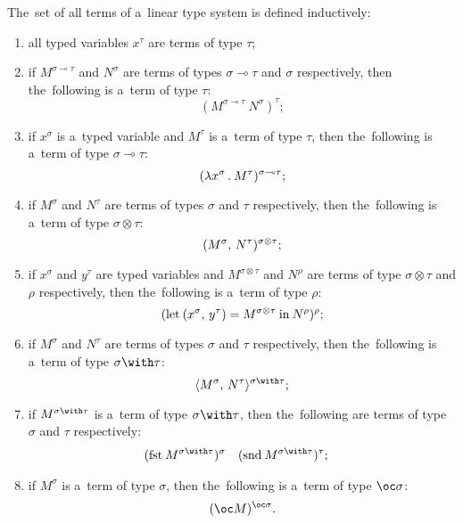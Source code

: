 \begin{definition}
  The~set of all terms of a~linear type system is defined inductively:
  \begin{enumerate}
    \item all typed variables $x^\tau$ are terms of type $\tau$;
    \item if $M^{\sigma \multimap \tau}$ and $N^\sigma$ are terms of types
      $\sigma \multimap \tau$ and $\sigma$ respectively, then the~following is
      a~term of type $\tau$:
      \[
        (M^{\sigma \multimap \tau} \: N^\sigma)^\tau;
      \]
    \item if $x^\sigma$ is a~typed variable and $M^\tau$ is a~term of type
      $\tau$, then the~following is a~term of type $\sigma \multimap \tau$:
      \[
        (\lambda x^\sigma \, . \: M^\tau)^{\sigma \multimap \tau};
      \]
    \item if $M^\sigma$ and $N^\tau$ are terms of types $\sigma$ and $\tau$
      respectively, then the~following is a~term of type $\sigma \otimes
      \tau$:
      \[
        (M^\sigma, \, N^\tau) ^{\sigma \otimes \tau};
      \]
    \item if $x^\sigma$ and $y^\tau$ are typed variables and $M^{\sigma \otimes
      \tau}$ and $N^\rho$ are terms of type $\sigma \otimes \tau$ and $\rho$
      respectively, then the~following is a~term of type $\rho$:
      \[
        (\textrm{let} \: (x^\sigma, \, y^\tau) = M^{\sigma \otimes \tau} \:
        \textrm{in} \: N^{\rho})^\rho;
      \]
    \item if $M^\sigma$ and $N^\tau$ are terms of types $\sigma$ and $\tau$
      respectively, then the~following is a~term of type $\sigma \with
      \tau$:
      \[
        \apair {M^\sigma} {N^\tau} ^{\sigma \with \tau};
      \]
    \item if $M^{\sigma \with \tau}$ is a~term of type $\sigma \with \tau$, then
      the~following are terms of type $\sigma$ and $\tau$ respectively:
      \begin{align*}
        (\fst M^{\sigma \with \tau})^\sigma&  &
          &(\snd M^{\sigma \with \tau})^\tau;
      \end{align*}
    \item if $M^\sigma$ is a~term of type $\sigma$, then the~following is a~term
      of type $\oc \sigma$:
      \[
        (\oc M)^{\oc \sigma}.
      \]
  \end{enumerate}
\end{definition}


